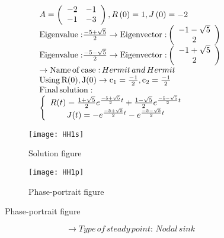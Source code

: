 \documentclass[a4paper]{article}
\begin{document}
\[\begin{array}{l}
A = \left( {\begin{array}{*{20}{c}}
{ - 2}&{ - 1}\\
{ - 1}&{ - 3}
\end{array}} \right),R\left( 0 \right) = 1,J\left( 0 \right) =  - 2\\
{\rm{Eigenvalue:}}\frac{{{\rm{ - 5 + }}\sqrt 5 }}{2} \to {\rm{Eigenvector:}}\left( {\begin{array}{*{20}{c}}
{ - 1 - \sqrt 5 }\\
2
\end{array}} \right)\\
{\rm{Eigenvalue:}}\frac{{{\rm{ - 5 - }}\sqrt 5 }}{2} \to {\rm{Eigenvector:}}\left( {\begin{array}{*{20}{c}}
{ - 1 + \sqrt 5 }\\
2
\end{array}} \right)\\
 \to {\rm{Name}}\,{\rm{of}}\,{\rm{case:}}\,Hermit\,and\,Hermit\\
{\rm{Using}}\,{\rm{R(0), J(0)}} \to {{\rm{c}}_1} = \frac{{ - 1}}{2},{\rm{ }}{{\rm{c}}_2} = \frac{{ - 1}}{2}\\
{\rm{Final}}\,{\rm{solution:}}\\
\left\{ {\begin{array}{*{20}{c}}
{R(t) = \frac{{1 + \sqrt 5 }}{2}{e^{\frac{{{\rm{ - 5 + }}\sqrt 5 }}{2}t}} + \frac{{1 - \sqrt 5 }}{2}{e^{\frac{{{\rm{ - 5 - }}\sqrt 5 }}{2}t}}}\\
{J(t) =  - {e^{\frac{{{\rm{ - 5 + }}\sqrt 5 }}{2}t}} - {e^{\frac{{{\rm{ - 5 - }}\sqrt 5 }}{2}t}}}
\end{array}} \right.
\end{array}\]
\begin{figure}[H]
\centering
\begin{subfigure}{.5\textwidth}
  \centering
  \texttt{[image: HH1s]}
  \caption*{Solution figure}
\end{subfigure}%
\begin{subfigure}{.5\textwidth}
  \centering
  \texttt{[image: HH1p]}
  \caption*{Phase-portrait figure}
\end{subfigure}
\end{figure}
\[  \to  Type\,of\,steady\,point:\,Nodal\,sink\]
\end{document}
